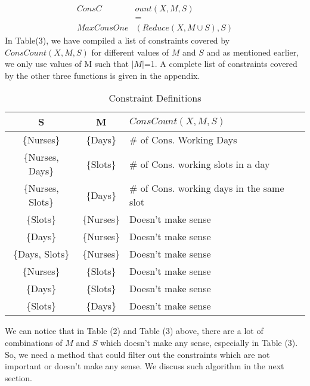 \documentclass{article}
\begin{document}
\begin{equation}
\begin{split}
ConsC&ount(X,M,S)\\
&=\\
MaxConsOne&(Reduce(X, M \cup S), S)
\end{split}
\end{equation}
\noindent
In Table(3), we have compiled a list of constraints covered by $ConsCount(X,M,S)$ for different values of $M$ and $S$ and as mentioned earlier, we only use values of M such that $|M|$=1. A complete list of constraints covered by the other three functions is given in the appendix.
\begin{table}[H]
\begin{center}
\caption{Constraint Definitions}
\label{my-label}
\begin{tabular}{|c|c| m{3cm} |}
\hline
S                 & M                 & $ConsCount(X,M,S)$                                                 \\ \hline
\{Nurses\}        & \{Days\}          & \# of Cons. Working Days                                         \\ \hline
\{Nurses, Days\}  & \{Slots\}         & \# of Cons. working slots in a day                                  \\ \hline
\{Nurses, Slots\} & \{Days\}          & \# of Cons. working days in the same slot                                  \\ \hline
\{Slots\}         & \{Nurses\}        & Doesn't make sense        \\ \hline
\{Days\}          & \{Nurses\}        & Doesn't make sense                                      \\ \hline
\{Days, Slots\}   & \{Nurses\}        & Doesn't make sense                                     \\ \hline
\{Nurses\}        & \{Slots\}         & Doesn't make sense                    \\ \hline
\{Days\}          & \{Slots\}         & Doesn't make sense \\ \hline
\{Slots\}         & \{Days\}          & Doesn't make sense                             \\ \hline
\end{tabular}
\end{center}
\end{table}
\noindent
We can notice that in Table (2) and Table (3) above, there are a lot of combinations of $M$ and $S$ which doesn't make any sense, especially in Table (3). So, we need a method that could filter out the constraints which are not important or doesn't make any sense. We discuss such algorithm in the next section.
\end{document}
